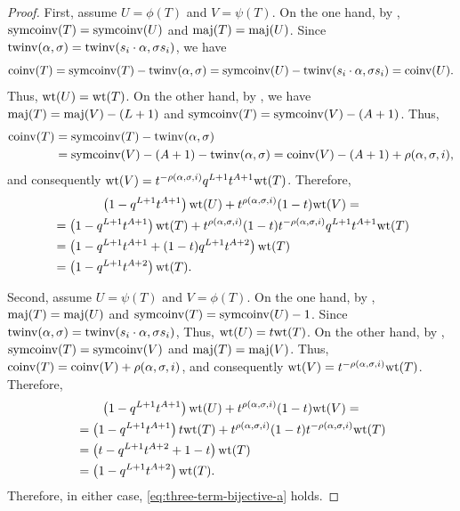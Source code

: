 \begin{proof}
    First, assume \(U = \phi(T)\) and \(V = \psi(T)\).
    On the one hand, by , \(\symcoinv(T) = \symcoinv(U)\) and \(\maj(T) = \maj(U)\).
    Since \(\operatorname{twinv}(\alpha, \sigma) = \operatorname{twinv}(s_i \cdot \alpha, \sigma s_i)\),
    we have \[\coinv(T) = \symcoinv(T) - \twinv(\alpha, \sigma) = \symcoinv(U) - \twinv(s_i \permact \alpha, \sigma s_i) = \coinv(U).\]
    Thus, \(\wt(U) = \wt(T)\).
    On the other hand, by ,
    we have \(\maj(T) = \maj(V) - (L+1)\) and \(\symcoinv(T) = \symcoinv(V) - (A+1)\).
    Thus,
    \begin{align*}
        \coinv(T) 
        & = \symcoinv(T) - \twinv(\alpha, \sigma) \\
        & = \symcoinv(V) - (A+1) - \twinv(\alpha, \sigma)
        = \coinv(V) - (A+1) + \rho(\alpha, \sigma, i),
    \end{align*}
    and consequently \(\wt(V) = t^{-\rho(\alpha,\sigma,i)} q^{L+1} t^{A+1} \wt(T)\).
    Therefore,
    \begin{multline*}
        \left( 1 - q^{L+1} t^{A+1} \right) \wt(U)
        +
        t^{\rho(\alpha,\sigma,i)} (1 - t) \wt(V)
        = \\
        \begin{aligned}
        &=
        \left( 1 - q^{L+1} t^{A+1} \right) \wt(T)
        +
        t^{\rho(\alpha,\sigma,i)} (1 - t) t^{-\rho(\alpha,\sigma,i)} q^{L+1} t^{A+1} \wt(T) \\
        &=
        \left( 1 - q^{L+1} t^{A+1} + (1 - t) q^{L+1} t^{A+2} \right) \wt(T) \\
        &=
        \left( 1 - q^{L+1} t^{A+2} \right) \wt(T).
        \end{aligned}
    \end{multline*}

    Second, assume \(U = \psi(T)\) and \(V = \phi(T)\).
    On the one hand, by , \(\maj(T) = \maj(U)\) and \(\symcoinv(T) = \symcoinv(U) - 1\).
    Since \(\operatorname{twinv}(\alpha, \sigma) = \operatorname{twinv}(s_i \cdot \alpha, \sigma s_i)\),
    Thus, \(\wt(U) = t \wt(T)\).
    On the other hand, by , \(\symcoinv(T) = \symcoinv(V)\) and \(\maj(T) = \maj(V)\).
    Thus, \(\coinv(T) = \coinv(V) + \rho(\alpha, \sigma, i)\),
    and consequently \(\wt(V) = t^{-\rho(\alpha,\sigma,i)} \wt(T)\).
    Therefore,
    \begin{multline*}
        \left( 1 - q^{L+1} t^{A+1} \right) \wt(U)
        +
        t^{\rho(\alpha,\sigma,i)} (1 - t) \wt(V)
        = \\
        \begin{aligned}
        &=
        \left( 1 - q^{L+1} t^{A+1} \right) t \wt(T)
        +
        t^{\rho(\alpha,\sigma,i)} (1 - t) t^{-\rho(\alpha,\sigma,i)} \wt(T) \\
        &=
        \left( t - q^{L+1} t^{A+2} + 1 - t \right) \wt(T) \\
        &=
        \left( 1 - q^{L+1} t^{A+2} \right) \wt(T).
        \end{aligned}
    \end{multline*}
    Therefore, in either case, \eqref{eq:three-term-bijective-a} holds.
\end{proof}


